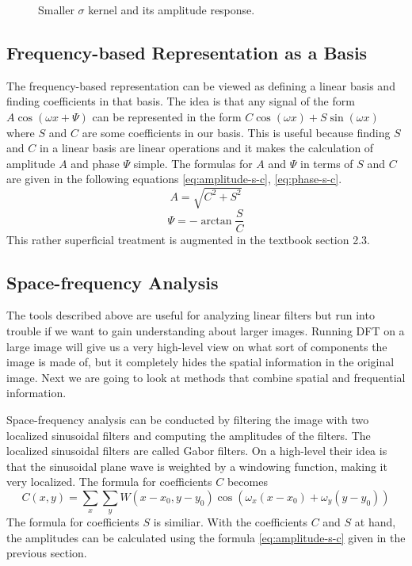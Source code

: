 \documentclass[]{article}
\begin{document}
\begin{figure}
\begin{subfigure}[t]{0.49\textwidth}
    \end{subfigure}
    \caption{Smaller $\sigma$ kernel and its amplitude response.}
    \label{fig:gaussian-kernel-2}
\end{figure}

\subsection{Frequency-based Representation as a Basis}
\label{frequency-based-representation-as-a-basis}
The frequency-based representation can be viewed as defining a linear basis and
finding coefficients in that basis. The idea is that any signal of the form $A
\cos(\omega x + \Psi)$ can be represented in the form $C\cos(\omega x) +
S\sin(\omega x)$ where $S$ and $C$ are some coefficients in our basis. This is
useful because finding $S$ and $C$ in a linear basis are linear operations and it
makes the calculation of amplitude $A$ and phase $\Psi$ simple. The formulas for
$A$ and $\Psi$ in terms of $S$ and $C$ are given in the following equations
\ref{eq:amplitude-s-c}, \ref{eq:phase-s-c}.
\begin{equation}
  \label{eq:amplitude-s-c}
  A = \sqrt{C^{2}+S^{2}}
\end{equation}
\begin{equation}
  \label{eq:phase-s-c}
  \Psi = -\arctan{\frac{S}{C}}
\end{equation}
This rather superficial treatment is augmented in the textbook section 2.3.

\subsection{Space-frequency Analysis}
\label{space-frequency-analysis}
The tools described above are useful for analyzing linear filters but run into
trouble if we want to gain understanding about larger images. Running DFT on a
large image will give us a very high-level view on what sort of components the
image is made of, but it completely hides the spatial information in the
original image. Next we are going to look at methods that combine spatial and
frequential information.

Space-frequency analysis can be conducted by filtering the image with two
localized sinusoidal filters and computing the amplitudes of the filters. The
localized sinusoidal filters are called Gabor filters. On a high-level their
idea is that the sinusoidal plane wave is weighted by a windowing function,
making it very localized. The formula for coefficients $C$ becomes
\begin{equation}
  C(x,y) = \sum_{x}{\sum_{y}{W(x-x_{0}, y-y_{0}) \cos(\omega_{x} (x - x_{0}) + \omega_{y} (y - y_{0})) }}
\end{equation}
The formula for coefficients $S$ is similiar. With the coefficients $C$ and $S$
at hand, the amplitudes can be calculated using the formula
\ref{eq:amplitude-s-c} given in the previous section.
\end{document}
